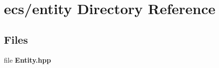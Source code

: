 \section{ecs/entity Directory Reference}
\label{dir_b8c6d8b713c4e761ced7ca02370920b8}
\subsection*{Files}
\begin{DoxyCompactItemize}
\item 
file \textbf{ Entity.\+hpp}
\end{DoxyCompactItemize}
